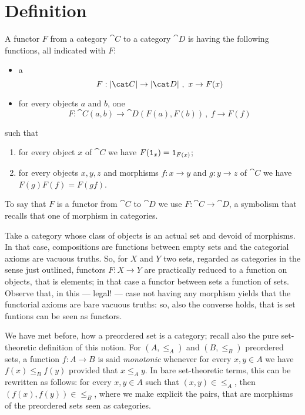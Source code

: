 
\section{Definition}

\begin{definition}[Functors]\label{definition:Functors}
A functor \(F\) from a category \(\cat C\) to a category \(\cat D\) is having the following functions, all indicated with \(F\):
\begin{itemize}
\item a 
\[F : \obj{\cat C} \to \obj{\cat D}\,,\ x \to F(x)\]
\item for every objects \(a\) and  \(b\), one 
\[F : \cat C(a, b) \to \cat D(F(a), F(b))\,,\ f \to F(f)\]
\end{itemize}
such that
\begin{enumerate}
\item for every object \(x\) of \(\cat C\) we have \(F(\mathtt 1_x) = \mathtt 1_{F(x)}\);
\item for every objects \(x, y, z\) and morphisms \(f : x \to y\) and \(g : y \to z\) of \(\cat C\) we have \(F(g) F(f) = F(gf)\).
\end{enumerate}
To say that \(F\) is a functor from \(\cat C\) to \(\cat D\) we use \(F : \cat C \to \cat D\), a symbolism that recalls that one of morphism in categories.
\end{definition}

\begin{example}\label{example:CollectionsAreCats}
Take a category whose class of objects is an actual set and devoid of morphisms. In that case, compositions are functions between empty sets and the categorial axioms are vacuous truths. So, for \(X\) and \(Y\) two sets, regarded as categories in the sense just outlined, functors \(F : X \to Y\) are practically reduced to a function on objects, that is elements; in that case a functor between sets  a function of sets. Observe that, in this --- legal! --- case not having any morphism yields that the functorial axioms are bare vacuous truths: so, also the converse holds, that is set funtions can be seen as functors. 
\end{example}

\begin{example}
We have met before, how a preordered set is a category; recall also the pure set-theoretic definition of this notion. For \((A, \le_A)\) and \((B, \le_B)\) preordered sets, a function \(f : A \to B\) is said {\em monotonic} whenever for every \(x, y \in A\) we have \(f(x) \le_B f(y)\) provided that \(x \le_A y\). In bare set-theoretic terms, this can be rewritten as follows: for every \(x, y \in A\) such that \((x, y) \in \le_A\), then \((f(x), f(y)) \in \le_B\), where  we make explicit the pairs, that are morphisms of the preordered sets seen as categories.
\end{example}

